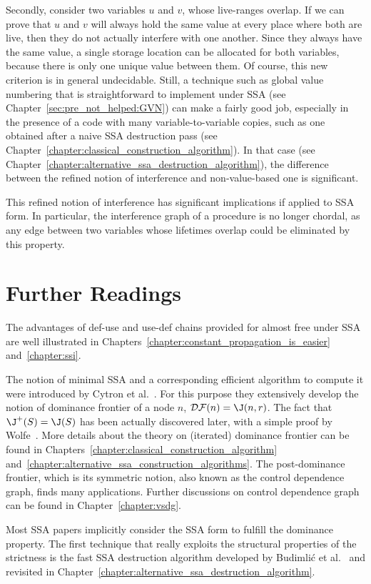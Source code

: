 Secondly, consider two variables $u$ and $v$, whose live-ranges overlap. 
If we can prove that $u$ and $v$ will always hold the same value at every place where both are live, then they do not actually interfere with one another. 
Since they always have the same value, a single storage location can be allocated for both variables, because there is only one unique value between them. 
Of course, this new criterion is in general undecidable. 
Still, a technique such as global value numbering that is straightforward to implement under SSA (see Chapter~\ref{sec:pre_not_helped:GVN}) can make a fairly good job, especially in the presence of a code with many variable-to-variable copies, such as one obtained after a naive SSA destruction pass (see Chapter~\ref{chapter:classical_construction_algorithm}). 
In that case (see Chapter~\ref{chapter:alternative_ssa_destruction_algorithm}), the difference between the refined notion of interference and non-value-based one is significant.

This refined notion of interference has significant implications if applied to SSA form. 
In particular, the interference graph of a procedure is no longer chordal, as any edge between two variables whose lifetimes overlap could be eliminated by this property.


\section{Further Readings}
The advantages of def-use and use-def chains provided for almost free under SSA are well illustrated in Chapters~\ref{chapter:constant_propagation_is_easier} and~\ref{chapter:ssi}.

The notion of minimal SSA and a corresponding efficient algorithm to compute it were introduced by Cytron et al.~\cite{CytronOct91}. 
For this purpose they extensively develop the notion of dominance frontier of a node $n$, ${\cal DF}(n)=\J(n,r)$. 
The fact that $\J^+(S)=\J(S)$ has been actually discovered later, with a simple proof by Wolfe~\cite{WolfeJul94}. 
More details about the theory on (iterated) dominance frontier can be found in Chapters~\ref{chapter:classical_construction_algorithm} and~\ref{chapter:alternative_ssa_construction_algorithms}. 
The post-dominance frontier, which is its symmetric notion, also known as the control dependence graph, finds many applications. 
Further discussions on control dependence graph can be found in Chapter~\ref{chapter:vsdg}.

Most SSA papers implicitly consider the SSA form to fulfill the dominance property. 
The first technique that really exploits the structural properties of the strictness is the fast SSA destruction algorithm developed by Budimli\'c et al.~\cite{BudimlicJun02} and revisited in Chapter~\ref{chapter:alternative_ssa_destruction_algorithm}.

